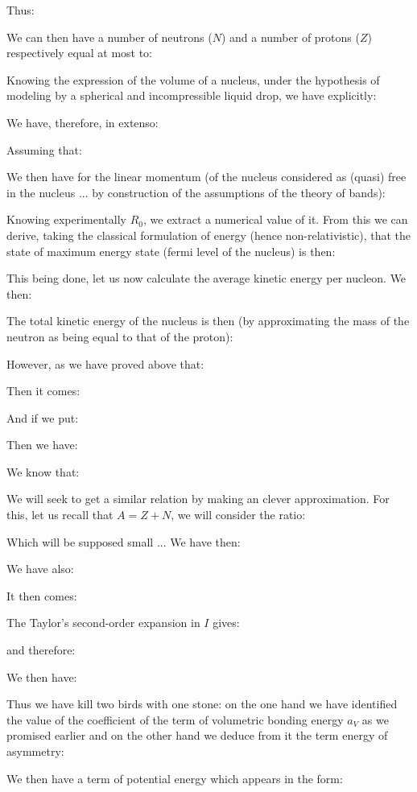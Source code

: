 	Thus:
	
	We can then have a number of neutrons ($N$) and a number of protons ($Z$) respectively equal at most to:
	
	Knowing the expression of the volume of a nucleus, under the hypothesis of modeling by a spherical and incompressible liquid drop, we have explicitly:
	
	We have, therefore, in extenso:
	
	Assuming that:
	
	We then have for the linear momentum (of the nucleus considered as (quasi) free in the nucleus ... by construction of the assumptions of the theory of bands):
	
	Knowing experimentally $R_0$, we extract a numerical value of it. From this we can derive, taking the classical formulation of energy (hence non-relativistic), that the state of maximum energy state (fermi level of the nucleus) is then:
	
	This being done, let us now calculate the average kinetic energy per nucleon. We then:
	
	The total kinetic energy of the nucleus is then (by approximating the mass of the neutron as being equal to that of the proton):
	
	However, as we have proved above that:
	
	Then it comes:
	
	And if we put:
	
	Then we have:
	
	We know that:
	
	We will seek to get a similar relation by making an clever approximation. For this, let us recall that $A = Z + N$, we will consider the ratio:
	
	Which will be supposed small ... We have then:
	
	We have also:
	
	It then comes:
	
	The Taylor's second-order expansion in $I$ gives:
	
	and therefore:
	
	We then have:
	
	Thus we have kill two birds with one stone: on the one hand we have identified the value of the coefficient of the term of volumetric bonding energy $a_V$ as we promised earlier and on the other hand we deduce from it the term energy of asymmetry:
	
	We then have a term of potential energy which appears in the form:
	
